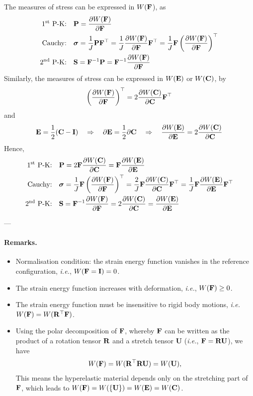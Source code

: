 \documentclass[12pt, a4paper]{article}
\numberwithin{equation}{section}
\begin{document}
The measures of stress can be expressed in $W(\mathbf{F}$), as
\begin{align}
    \text{1\textsuperscript{st} P-K:} & \quad \mathbf{P} = \frac{\partial W(\mathbf{F})}{\partial \mathbf{F}} \\
    \text{Cauchy:} & \quad \boldsymbol{\sigma} = \frac{1}{J} \mathbf{P} \mathbf{F}^\top = \frac{1}{J} \frac{\partial W(\mathbf{F})}{\partial \mathbf{F}} \mathbf{F}^\top = \frac{1}{J} \mathbf{F} \left( \frac{\partial W(\mathbf{F})}{\partial \mathbf{F}} \right)^\top \\
    \text{2\textsuperscript{nd} P-K:} & \quad \mathbf{S} = \mathbf{F}^{-1} \mathbf{P} = \mathbf{F}^{-1} \frac{\partial W(\mathbf{F})}{\partial \mathbf{F}}
\end{align}
Similarly, the measures of stress can be expressed in $W(\mathbf{E})$ or $W(\mathbf{C})$, by 
\[
    \left( \frac{\partial W(\mathbf{F})}{\partial \mathbf{F}} \right)^\top = 2 \frac{\partial W(\mathbf{C})}{\partial \mathbf{C}} \mathbf{F}^\top
\]
and 
\[
    \mathbf{E} = \frac{1}{2} (\mathbf{C} - \mathbf{I}) 
    \quad \Rightarrow \quad
    \partial \mathbf{E} = \frac{1}{2} \partial \mathbf{C}
    \quad \Rightarrow \quad
    \frac{\partial W(\mathbf{E})}{\partial \mathbf{E}} = 2 \frac{\partial W(\mathbf{C})}{\partial \mathbf{C}}
\]
Hence,
\begin{align}
\label{eqn:pk1}
    \text{1\textsuperscript{st} P-K:} & \quad \mathbf{P} = 2 \mathbf{F} \frac{\partial W(\mathbf{C})}{\partial \mathbf{C}} = \mathbf{F} \frac{\partial W(\mathbf{E})}{\partial \mathbf{E}} \\
\label{eqn:cauchy}
    \text{Cauchy:} & \quad \boldsymbol{\sigma} = \frac{1}{J} \mathbf{F} \left( \frac{\partial W(\mathbf{F})}{\partial \mathbf{F}} \right)^\top = \frac{2}{J} \mathbf{F} \frac{\partial W(\mathbf{C})}{\partial \mathbf{C}}\mathbf{F}^\top = \frac{1}{J} \mathbf{F} \frac{\partial W(\mathbf{E})}{\partial \mathbf{E}}\mathbf{F}^\top\\
\label{eqn:pk2}
    \text{2\textsuperscript{nd} P-K:} & \quad \mathbf{S} = \mathbf{F}^{-1} \frac{\partial W(\mathbf{F})}{\partial \mathbf{F}} = 2 \frac{\partial W(\mathbf{C})}{\partial \mathbf{C}} = \frac{\partial W(\mathbf{E})}{\partial \mathbf{E}}
\end{align}

---
\paragraph{Remarks.}
\begin{itemize}
    \item Normalisation condition: the strain energy function vanishes in the reference configuration, \textit{i.e.}, $W(\mathbf{F}=\mathbf{I}) = 0$.
    \item The strain energy function increases with deformation, \textit{i.e.}, $W(\mathbf{F}) \geq 0$. 
    \item The strain energy function must be insensitive to rigid body motions, \textit{i.e.} $W(\mathbf{F}) = W(\mathbf{R}^\top \mathbf{F})$.
    \item Using the polar decomposition of $\mathbf{F}$, whereby $\mathbf{F}$ can be written as the product of a rotation tensor $\mathbf{R}$ and a stretch tensor $\mathbf{U}$ (\textit{i.e.}, $\mathbf{F} = \mathbf{R} \mathbf{U}$), we have
    \[
        W(\mathbf{F}) = W(\mathbf{R}^\top \mathbf{R} \mathbf{U}) = W(\mathbf{U}),
    \]
    This means the hyperelastic material depends only on the stretching part of $\mathbf{F}$, which leads to $W(\mathbf{F}) = W(\{\mathbf{U}\}) = W(\mathbf{E}) = W(\mathbf{C})$.
\end{itemize}
\end{document}
